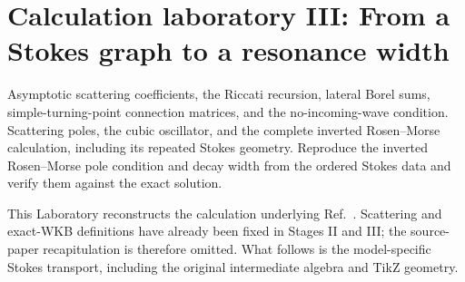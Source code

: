 \section{Calculation laboratory III: From a Stokes graph to a resonance width}
\label{lab:2503_18741}

\calculationroute
  {Asymptotic scattering coefficients, the Riccati recursion, lateral Borel sums, simple-turning-point connection matrices, and the no-incoming-wave condition.}
  {Scattering poles, the cubic oscillator, and the complete inverted Rosen--Morse calculation, including its repeated Stokes geometry.}
  {Reproduce the inverted Rosen--Morse pole condition and decay width from the ordered Stokes data and verify them against the exact solution.}

This Laboratory reconstructs the calculation underlying
Ref.~\cite{Morikawa:2025grx}.  Scattering and exact-WKB definitions have
already been fixed in Stages II and III; the source-paper recapitulation is
therefore omitted.  What follows is the model-specific Stokes transport,
including the original intermediate algebra and TikZ geometry.

